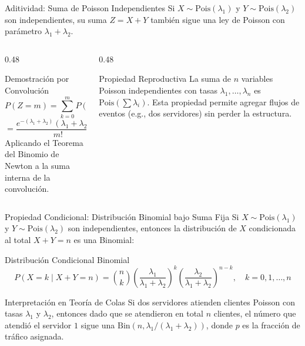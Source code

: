\documentclass[10pt, aspectratio=169]{beamer}
\begin{document}
\begin{frame}{Aditividad: Suma de Poisson Independientes}
  \footnotesize
  Si $X \sim \text{Pois}(\lambda_{1})$ y $Y \sim \text{Pois}(\lambda_{2})$ son independientes, su suma $Z = X + Y$ también sigue una ley de Poisson con parámetro $\lambda_{1} + \lambda_{2}$. \pause

  \vspace{0.1cm}
  \begin{columns}[T]
    \begin{column}{0.48\textwidth}
      \begin{block}{Demostración por Convolución}
        \scriptsize
        $$P(Z = m) = \sum_{k=0}^{m} P(X=k) P(Y=m-k)$$
        $$= \dfrac{e^{-(\lambda_{1}+\lambda_{2})}(\lambda_{1}+\lambda_{2})^{m}}{m!}$$
        Aplicando el Teorema del Binomio de Newton a la suma interna de la convolución.
      \end{block}
    \end{column}
    \begin{column}{0.48\textwidth}
      \begin{alertblock}{Propiedad Reproductiva}
        \scriptsize
        La suma de $n$ variables Poisson independientes con tasas $\lambda_{1}, \dots, \lambda_{n}$ es $\text{Pois}(\sum \lambda_{i})$. Esta propiedad permite agregar flujos de eventos (e.g., dos servidores) sin perder la estructura.
      \end{alertblock}
    \end{column}
  \end{columns}
\end{frame}

\begin{frame}{Propiedad Condicional: Distribución Binomial bajo Suma Fija}
  \footnotesize
  Si $X \sim \text{Pois}(\lambda_{1})$ y $Y \sim \text{Pois}(\lambda_{2})$ son independientes, entonces la distribución de $X$ condicionada al total $X + Y = n$ es una Binomial: \pause

  \vspace{0.1cm}
  \begin{block}{Distribución Condicional Binomial}
    $$P(X = k \mid X + Y = n) = \binom{n}{k} \left(\dfrac{\lambda_{1}}{\lambda_{1} + \lambda_{2}}\right)^{k} \left(\dfrac{\lambda_{2}}{\lambda_{1} + \lambda_{2}}\right)^{n-k}, \quad k = 0, 1, \dots, n$$
  \end{block}

  \vspace{0.1cm}
  \pause
  \begin{alertblock}{Interpretación en Teoría de Colas}
    Si dos servidores atienden clientes Poisson con tasas $\lambda_{1}$ y $\lambda_{2}$, entonces dado que se atendieron en total $n$ clientes, el número que atendió el servidor $1$ sigue una $\text{Bin}(n, \lambda_{1}/(\lambda_{1}+\lambda_{2}))$, donde $p$ es la fracción de tráfico asignada.
  \end{alertblock}
\end{frame}
\end{document}
